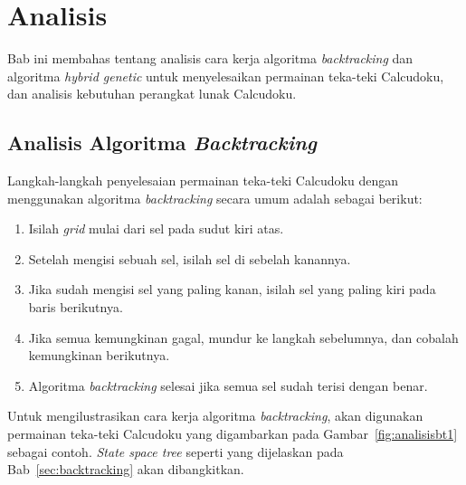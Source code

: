 \chapter{Analisis}
\label{chap:analisis}

Bab ini membahas tentang analisis cara kerja algoritma \textit{backtracking} dan algoritma \textit{hybrid genetic} untuk menyelesaikan permainan teka-teki Calcudoku, dan analisis kebutuhan perangkat lunak Calcudoku.

\section{Analisis Algoritma \textit{Backtracking}}
\label{sec:analisisbt}

Langkah-langkah penyelesaian permainan teka-teki Calcudoku dengan menggunakan algoritma \textit{backtracking} secara umum adalah sebagai berikut:

\begin{enumerate}
\item Isilah \textit{grid} mulai dari sel pada sudut kiri atas.
\item Setelah mengisi sebuah sel, isilah sel di sebelah kanannya.
\item Jika sudah mengisi sel yang paling kanan, isilah sel yang paling kiri pada baris berikutnya.
\item Jika semua kemungkinan gagal, mundur ke langkah sebelumnya, dan cobalah kemungkinan berikutnya.
\item Algoritma \textit{backtracking} selesai jika semua sel sudah terisi dengan benar.
\end{enumerate}

Untuk mengilustrasikan cara kerja algoritma \textit{backtracking}, akan digunakan permainan teka-teki Calcudoku yang digambarkan pada Gambar~\ref{fig:analisisbt1} sebagai contoh. \textit{State space tree} seperti yang dijelaskan pada Bab~\ref{sec:backtracking} akan dibangkitkan.

